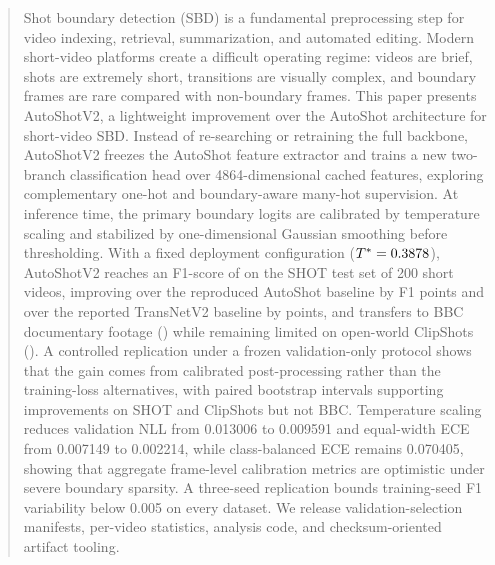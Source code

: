 \begin{abstract}
Shot boundary detection (SBD) is a fundamental preprocessing step for video
indexing, retrieval, summarization, and automated editing. Modern short-video
platforms create a difficult operating regime: videos are brief, shots are
extremely short, transitions are visually complex, and boundary frames are
rare compared with non-boundary frames. This paper presents AutoShotV2, a
lightweight improvement over the AutoShot architecture for short-video SBD.
Instead of re-searching or retraining the full backbone, AutoShotV2 freezes
the AutoShot feature extractor and trains a new two-branch classification
head over 4864-dimensional cached features, exploring complementary one-hot
and boundary-aware many-hot supervision. At inference time, the primary
boundary logits are calibrated by temperature scaling and stabilized by
one-dimensional Gaussian smoothing before thresholding. With a fixed
deployment configuration ($T^{*}=\PaperDeployTemperature$), AutoShotV2
reaches an F1-score of \PaperDeployShotFOne{} on the SHOT test set of 200
short videos, improving over the reproduced AutoShot baseline by
\PaperDeployVsAutoShotPP{} F1 points and over the reported TransNetV2
baseline by \PaperDeployVsTransNetPP{} points, and transfers to BBC
documentary footage (\PaperDeployBBCFOne) while remaining limited on
open-world ClipShots (\PaperDeployClipFOne). A controlled replication under
a frozen validation-only protocol shows that the gain comes from calibrated
post-processing rather than the training-loss alternatives, with paired
bootstrap intervals supporting improvements on SHOT and ClipShots but not
BBC. Temperature scaling reduces validation NLL from 0.013006 to 0.009591
and equal-width ECE from 0.007149 to 0.002214, while class-balanced ECE
remains 0.070405, showing that aggregate frame-level calibration metrics are
optimistic under severe boundary sparsity. A three-seed replication bounds
training-seed F1 variability below 0.005 on every dataset. We release
validation-selection manifests, per-video statistics, analysis code, and
checksum-oriented artifact tooling.
\end{abstract}
